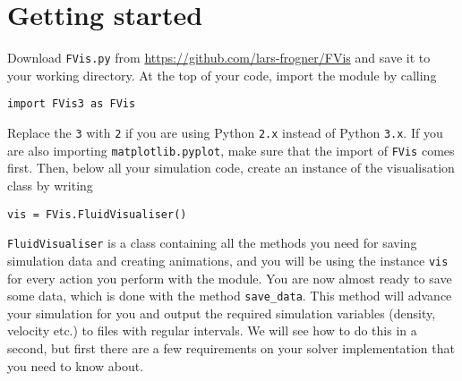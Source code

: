 \documentclass{article}
\newcommand{\ttt}[1]{\texttt{#1}}
\begin{document}
\section{Getting started}
\label{sec:start}
Download \ttt{FVis.py} from \url{https://github.com/lars-frogner/FVis} and save it to your working directory. At the top of your code, import the module by calling
\begin{lstlisting}
import FVis3 as FVis
\end{lstlisting}
Replace the \ttt{3} with \ttt{2} if you are using Python \ttt{2.x} instead of Python \ttt{3.x}. If you are also importing \ttt{matplotlib.pyplot}, make sure that the import of \ttt{FVis} comes first. Then, below all your simulation code, create an instance of the visualisation class by writing
\begin{lstlisting}
vis = FVis.FluidVisualiser()
\end{lstlisting}
\ttt{FluidVisualiser} is a class containing all the methods you need for saving simulation data and creating animations, and you will be using the instance \ttt{vis} for every action you perform with the module. You are now almost ready to save some data, which is done with the method \ttt{save\_data}. This method will advance your simulation for you and output the required simulation variables (density, velocity etc.) to files with regular intervals. We will see how to do this in a second, but first there are a few requirements on your solver implementation that you need to know about.
\end{document}
